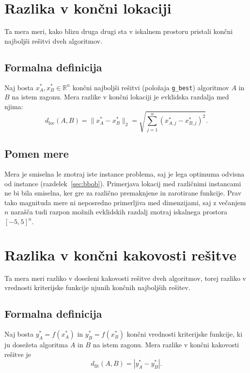 \documentclass[a4paper, 12pt]{book}
\begin{document}
\section{Razlika v končni lokaciji}
\label{sec:location}

Ta mera meri, kako blizu druga drugi sta v iskalnem prostoru pristali
končni najboljši rešitvi dveh algoritmov.

\subsection{Formalna definicija}

Naj bosta $x^{*}_A, x^{*}_B \in \mathbb{R}^n$ končni najboljši rešitvi
(položaja \texttt{g\_best}) algoritmov $A$ in $B$ na istem zagonu. Mera razlike v
končni lokaciji je evklidska razdalja med njima:
\[
    d_{\text{loc}}(A, B) = \lVert x^{*}_A - x^{*}_B \rVert_2
    = \sqrt{\sum_{j=1}^{n} \left( x^{*}_{A,j} - x^{*}_{B,j} \right)^2}.
\]

\subsection{Pomen mere}

Mera je smiselna le znotraj iste instance problema, saj je lega optimuma
od\-vis\-na od instance (razdelek~\ref{sec:bbob}). Primerjava lokacij med
različnimi instancami ne bi bila smiselna, ker gre za različno premaknjene in zarotirane funkcije. Prav tako magnituda mere ni neposredno
primerljiva med dimenzijami, saj z večanjem $n$ narašča tudi razpon možnih
evklidskih razdalj znotraj iskalnega prostora $[-5,5]^n$.

\section{Razlika v končni kakovosti rešitve}
\label{sec:fitness}

Ta mera meri razliko v doseženi kakovosti rešitve dveh algoritmov, torej
razliko v vrednosti kriterijske funkcije njunih končnih najboljših rešitev.

\subsection{Formalna definicija}

Naj bosta $y^{*}_A = f(x^{*}_A)$ in $y^{*}_B = f(x^{*}_B)$ končni vrednosti
kriterijske funkcije, ki ju dosežeta algoritma $A$ in $B$ na istem zagonu.
Mera razlike v končni kakovosti rešitve je
\[
    d_{\text{fit}}(A, B) = \left| y^{*}_A - y^{*}_B \right|.
\]
\end{document}
